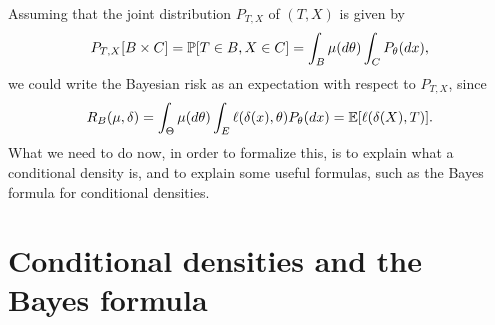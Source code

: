 Assuming that the joint distribution $P_{T, X}$ of $(T, X)$ is given by
\begin{align*}
	P_{T, X}[B \times C] = \P[ T \in B, X \in C] = \int_B \mu(d \theta) \int_C P_\theta(dx),
\end{align*}
we could write the Bayesian risk as an expectation with respect to $P_{T, X}$, since
\begin{equation*}
	R_B(\mu, \delta) = \int_{\Theta} \mu(d \theta) \int_E \ell(\delta(x), \theta) P_\theta(dx) = \E[ \ell(\delta(X), T)].
\end{equation*}
What we need to do now, in order to formalize this, is to explain what a conditional density is, and to explain some useful formulas, such as the Bayes formula for conditional densities.

\section{Conditional densities and the Bayes formula} %
\label{sec:about_conditional_distributions_and_densities}

